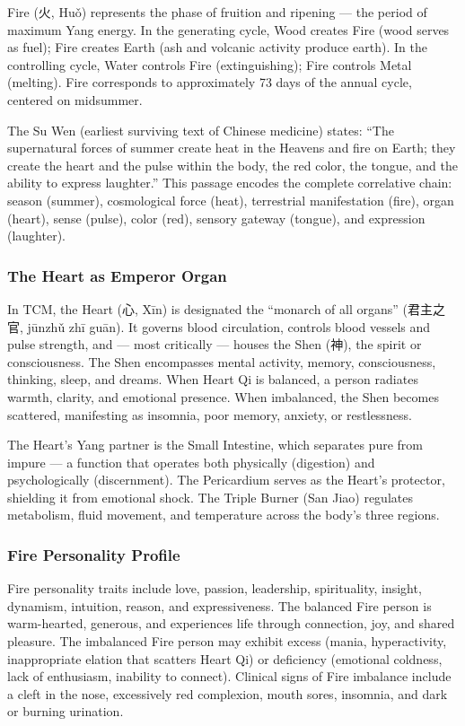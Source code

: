 \documentclass[11pt,letterpaper]{article}
\begin{document}
Fire (火, Huǒ) represents the phase of fruition and ripening --- the period of maximum Yang energy. In the generating cycle, Wood creates Fire (wood serves as fuel); Fire creates Earth (ash and volcanic activity produce earth). In the controlling cycle, Water controls Fire (extinguishing); Fire controls Metal (melting). Fire corresponds to approximately 73 days of the annual cycle, centered on midsummer.

The Su Wen (earliest surviving text of Chinese medicine) states: ``The supernatural forces of summer create heat in the Heavens and fire on Earth; they create the heart and the pulse within the body, the red color, the tongue, and the ability to express laughter.'' This passage encodes the complete correlative chain: season (summer), cosmological force (heat), terrestrial manifestation (fire), organ (heart), sense (pulse), color (red), sensory gateway (tongue), and expression (laughter).

\subsubsection{The Heart as Emperor Organ}

In TCM, the Heart (心, Xīn) is designated the ``monarch of all organs'' (君主之官, jūnzhǔ zhī guān). It governs blood circulation, controls blood vessels and pulse strength, and --- most critically --- houses the Shen (神), the spirit or consciousness. The Shen encompasses mental activity, memory, consciousness, thinking, sleep, and dreams. When Heart Qi is balanced, a person radiates warmth, clarity, and emotional presence. When imbalanced, the Shen becomes scattered, manifesting as insomnia, poor memory, anxiety, or restlessness.

The Heart's Yang partner is the Small Intestine, which separates pure from impure --- a function that operates both physically (digestion) and psychologically (discernment). The Pericardium serves as the Heart's protector, shielding it from emotional shock. The Triple Burner (San Jiao) regulates metabolism, fluid movement, and temperature across the body's three regions.

\subsubsection{Fire Personality Profile}

Fire personality traits include love, passion, leadership, spirituality, insight, dynamism, intuition, reason, and expressiveness. The balanced Fire person is warm-hearted, generous, and experiences life through connection, joy, and shared pleasure. The imbalanced Fire person may exhibit excess (mania, hyperactivity, inappropriate elation that scatters Heart Qi) or deficiency (emotional coldness, lack of enthusiasm, inability to connect). Clinical signs of Fire imbalance include a cleft in the nose, excessively red complexion, mouth sores, insomnia, and dark or burning urination.
\end{document}
